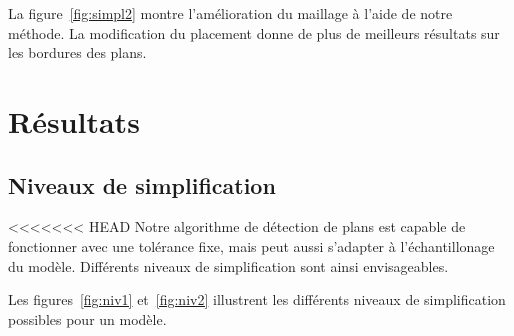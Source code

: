 ﻿\documentclass[12pt, twoside]{article}
\let\oldsection\section
\def\section{\cleardoublepage\oldsection}
\begin{document}
La figure~\ref{fig:simpl2} montre l'amélioration du maillage à l'aide de notre méthode. La modification du placement donne de plus de meilleurs résultats sur les bordures des plans.

\section{Résultats}
\subsection{Niveaux de simplification}
<<<<<<< HEAD
Notre algorithme de détection de plans est capable de fonctionner avec une tolérance fixe, mais peut aussi s'adapter à l'échantillonage du modèle. Différents niveaux de simplification sont ainsi envisageables.

Les figures~\ref{fig:niv1} et~\ref{fig:niv2} illustrent les différents niveaux de simplification possibles pour un modèle.
\end{document}
